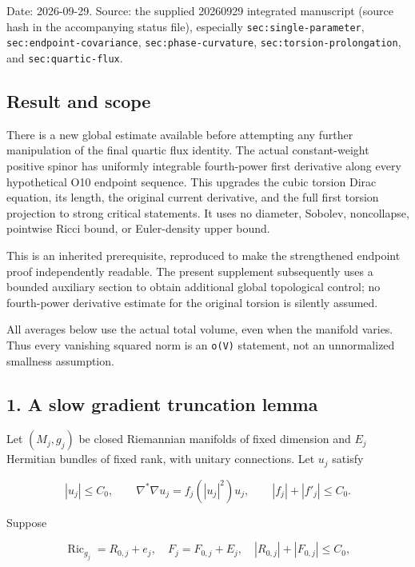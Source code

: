 \documentclass[11pt]{article}
\begin{document}
Date: 2026-09-29. Source: the supplied 20260929 integrated manuscript
(source hash in the accompanying status file), especially
\texttt{sec:single-parameter}, \texttt{sec:endpoint-covariance},
\texttt{sec:phase-curvature}, \texttt{sec:torsion-prolongation}, and
\texttt{sec:quartic-flux}.

\hypertarget{result-and-scope}{%
\subsection{Result and scope}\label{result-and-scope}}

There is a new global estimate available before attempting any further
manipulation of the final quartic flux identity. The actual
constant-weight positive spinor has uniformly integrable fourth-power
first derivative along every hypothetical O10 endpoint sequence. This
upgrades the cubic torsion Dirac equation, its length, the original
current derivative, and the full first torsion projection to strong
critical statements. It uses no diameter, Sobolev, noncollapse,
pointwise Ricci bound, or Euler-density upper bound.

This is an inherited prerequisite, reproduced to make the strengthened
endpoint proof independently readable. The present supplement
subsequently uses a bounded auxiliary section to obtain additional
global topological control; no fourth-power derivative estimate for the
original torsion is silently assumed.

All averages below use the actual total volume, even when the manifold
varies. Thus every vanishing squared norm is an \texttt{o(V)} statement,
not an unnormalized smallness assumption.

\hypertarget{a-slow-gradient-truncation-lemma}{%
\subsection{1. A slow gradient truncation
lemma}\label{a-slow-gradient-truncation-lemma}}

Let \((M_j,g_j)\) be closed Riemannian manifolds of fixed dimension and
\(E_j\) Hermitian bundles of fixed rank, with unitary connections. Let
\(u_j\) satisfy

\[
 |u_j|\le C_0,\qquad \nabla^*\nabla u_j=f_j(|u_j|^2)u_j,
 \qquad |f_j|+|f'_j|\le C_0.
\]

Suppose

\[
 \operatorname{Ric}_{g_j}=R_{0,j}+e_j,
 \quad F_j=F_{0,j}+E_j,
 \quad |R_{0,j}|+|F_{0,j}|\le C_0,
\]
\end{document}
